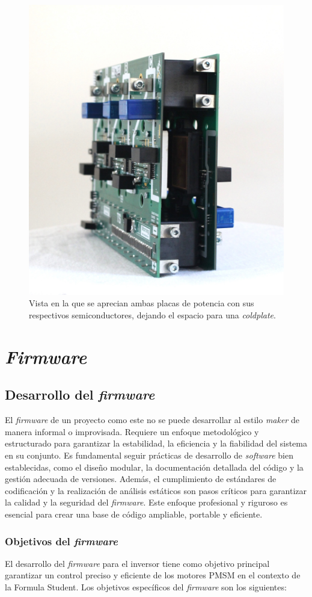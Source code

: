 \begin{figure}[H]
	\centering
	\includegraphics[width=0.5\linewidth]{fig/assembly7}
	\caption{Vista en la que se aprecian ambas placas de potencia con sus respectivos semiconductores, dejando el espacio para una \textit{coldplate}.}
\end{figure}


\newpage
\section{\textit{Firmware}}

\subsection{Desarrollo del \textit{firmware}}
El \textit{firmware} de un proyecto como este no se puede desarrollar al estilo \textit{maker} de manera informal o improvisada. Requiere un enfoque metodológico y estructurado para garantizar la estabilidad, la eficiencia y la fiabilidad del sistema en su conjunto. Es fundamental seguir prácticas de desarrollo de \textit{software} bien establecidas, como el diseño modular, la documentación detallada del código y la gestión adecuada de versiones. Además, el cumplimiento de estándares de codificación y la realización de análisis estáticos son pasos críticos para garantizar la calidad y la seguridad del \textit{firmware}. Este enfoque profesional y riguroso es esencial para crear una base de código ampliable, portable y eficiente.

\subsubsection{Objetivos del \textit{firmware}}
El desarrollo del \textit{firmware} para el inversor tiene como objetivo principal garantizar un control preciso y eficiente de los motores PMSM en el contexto de la Formula Student. Los objetivos específicos del \textit{firmware} son los siguientes:

